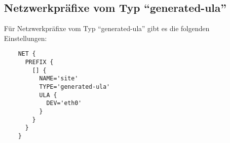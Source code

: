 \subsection{Netzwerkpräfixe vom Typ ``generated-ula''}
Für Netzwerkpräfixe vom Typ ``generated-ula'' gibt es die folgenden
Einstellungen:

\begin{description}
  \begin{example}
  \begin{verbatim}
    NET {
      PREFIX {
        [] {
          NAME='site'
          TYPE='generated-ula'
          ULA {
            DEV='eth0'
          }
        }
      }
    }
  \end{verbatim}
  \end{example}

\end{description}
